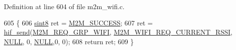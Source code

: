 Definition at line 604 of file m2m\+\_\+wifi.\+c.


\begin{DoxyCode}
605 \{
606     \hyperlink{group__DataT_gae35f10ffd0ac8dd2bc3e794da9bdfbc7}{sint8} ret = \hyperlink{nm__common_8h_a9ef27ba27aafdd1aa3a79d3ba2c36b8f}{M2M\_SUCCESS};
607     ret = \hyperlink{m2m__hif_8c_a13ba8ad11b2ac39516ca787386d16ce0}{hif\_send}(\hyperlink{nm__common_8h_a9ab02eb1aea02a75c3f5aade4eef1276aeb9a7d57324ba4b8a6c2a5f46dd499c2}{M2M\_REQ\_GRP\_WIFI}, 
      \hyperlink{group__WlanEnums_gga57466b36df595c593e7ccc9892e14b20a53bc10f0a87f11ba6b111321d362fc66}{M2M\_WIFI\_REQ\_CURRENT\_RSSI}, \hyperlink{group__BSPDefine_ga070d2ce7b6bb7e5c05602aa8c308d0c4}{NULL}, 0, \hyperlink{group__BSPDefine_ga070d2ce7b6bb7e5c05602aa8c308d0c4}{NULL},0, 0);
608     \textcolor{keywordflow}{return} ret;
609 \}
\end{DoxyCode}
